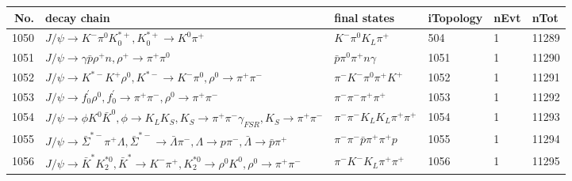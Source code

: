 \begin{table}[htbp] 
\begin{center}
\begin{small}
\begin{tabular}{rlllll}\hline\hline
 No. & decay chain & final states &  iTopology & nEvt & nTot \\\hline
1050&$J/\psi       \rightarrow K^{-}          \pi^{0}        K_{0}^{*+}     , K_{0}^{*+}      \rightarrow K^{0}          \pi^{+}        $&$K^{-}          \pi^{0}        K_{L}          \pi^{+}        $&  504&    1&11289\\
1051&$J/\psi       \rightarrow \gamma       \bar{p}          \rho^{+}      n                 , \rho^{+}       \rightarrow \pi^{+}        \pi^{0}        $&$\bar{p}          \pi^{0}        \pi^{+}        n                 \gamma       $& 1051&    1&11290\\
1052&$J/\psi       \rightarrow K^{*-}         K^{+}          \rho^{0}      , K^{*-}          \rightarrow K^{-}          \pi^{0}        , \rho^{0}       \rightarrow \pi^{+}        \pi^{-}        $&$\pi^{-}        K^{-}          \pi^{0}        \pi^{+}        K^{+}          $& 1052&    1&11291\\
1053&$J/\psi       \rightarrow f^{'}_{0}     \rho^{0}      , f^{'}_{0}      \rightarrow \pi^{+}        \pi^{-}        , \rho^{0}       \rightarrow \pi^{+}        \pi^{-}        $&$\pi^{-}        \pi^{-}        \pi^{+}        \pi^{+}        $& 1053&    1&11292\\
1054&$J/\psi       \rightarrow \phi           K^{0}          \bar{K}^{0}   , \phi            \rightarrow K_{L}          K_{S}          , K_{S}           \rightarrow \pi^{+}        \pi^{-}        \gamma_{FSR} , K_{S}           \rightarrow \pi^{+}        \pi^{-}        $&$\pi^{-}        \pi^{-}        K_{L}          K_{L}          \pi^{+}        \pi^{+}        $& 1054&    1&11293\\
1055&$J/\psi       \rightarrow \bar{\Sigma}^{*-}\pi^{+}        \Lambda           , \bar{\Sigma}^{*-} \rightarrow \bar{\Lambda}    \pi^{-}        , \Lambda            \rightarrow p                 \pi^{-}        , \bar{\Lambda}     \rightarrow \bar{p}          \pi^{+}        $&$\pi^{-}        \pi^{-}        \bar{p}          \pi^{+}        \pi^{+}        p                 $& 1055&    1&11294\\
1056&$J/\psi       \rightarrow \bar{K}^{*}   K_2^{*0}       , \bar{K}^{*}    \rightarrow K^{-}          \pi^{+}        , K_2^{*0}        \rightarrow \rho^{0}      K^{0}          , \rho^{0}       \rightarrow \pi^{+}        \pi^{-}        $&$\pi^{-}        K^{-}          K_{L}          \pi^{+}        \pi^{+}        $& 1056&    1&11295\\

\end{tabular}
\end{small}
\end{center}
\end{table}
